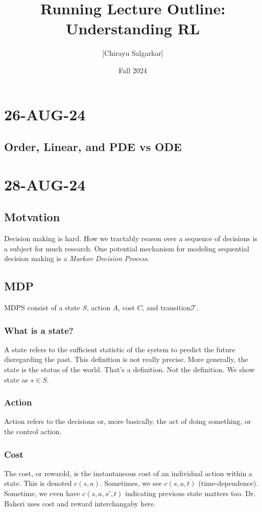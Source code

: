 \documentclass[10pt, oneside]{article}
\title{Running Lecture Outline: Understanding RL}
\author{[Chirayu Salgarkar]}
\date{Fall 2024}
\theoremstyle{definition}
\begin{document}
\maketitle
\tableofcontents

\vspace{.25in}
\section{26-AUG-24}
\subsection{Order, Linear, and PDE vs ODE}
\section{28-AUG-24}

\subsection{Motvation}
Decision making is hard. How we tractably reason over a sequence of decisions is a subject for much research. One potential mechanism for modeling sequential decision making is a \textit{Markov Decision Process}. 
\subsection{MDP}
MDPS consist of a state $S$, action $A$, cost $C$, and transition$\mathcal{T}$.
\subsubsection{What is a state?}
A state refers to the sufficient statistic of the system to predict the future disregarding the past. This definition is not really precise. More generally, the state is the status of the world. That's a definition. Not the definition. 
We show state as $s \in S$.
\subsubsection{Action}
Action refers to the decisions or, more basically, the act of doing something, or the control action. 
\subsubsection{Cost}
The cost, or rewardd, is the instantaneous cost of an individual action within a state. This is denoted $c(s,a)$. Sometimes, we see $c(s,a,t)$ (time-dependence). Sometime, we even have $c(s,a,s',t)$ indicating previous state matters too. 
Dr. Baheri uses cost and reward interchangaby here. 
\end{document}
